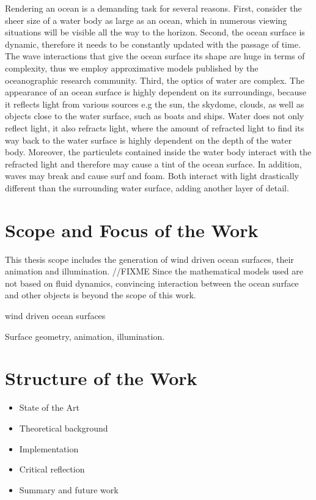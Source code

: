 Rendering an ocean is a demanding task for several reasons. First, consider the
sheer size of a water body as large as an ocean, which in numerous viewing
situations will be visible all the way to the horizon. Second, the ocean surface
is dynamic, therefore it needs to be constantly updated with the passage of time.
The wave interactions that give the ocean surface its shape are huge in terms of
complexity, thus we employ approximative models published by the oceanographic
research community.
Third, the optics of water are complex. The appearance of an ocean surface is
highly dependent on its surroundings, because it reflects light from various
sources e.g the sun, the skydome, clouds, as well as objects close to the
water surface, such as boats and ships. Water does not only reflect light, it
also refracts light, where the amount of refracted light to find its way back
to the water surface is highly dependent on the depth of the water body.
Moreover, the particulets contained inside the water body interact with the
refracted light and therefore may cause a tint of the ocean surface.
In addition, waves may break and cause surf and foam. Both interact with light
drastically different than the surrounding water surface, adding another layer
of detail.


% 
% 

\section{Scope and Focus of the Work}
\label{sec:scope_and_focus}

This thesis scope includes the generation of wind driven ocean surfaces, their
animation and illumination. //FIXME
Since the mathematical models used are not based on fluid dynamics,
convincing interaction between the ocean surface and other objects is beyond the
scope of this work.

wind driven ocean surfaces

Surface geometry, animation, illumination.

\section{Structure of the Work}
\label{sec:structure}

\begin{itemize}

\item State of the Art
\item Theoretical background
\item Implementation
\item Critical reflection
\item Summary and future work

\end{itemize}
